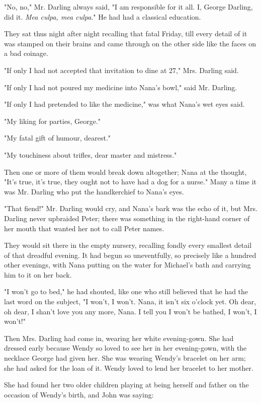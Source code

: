"No, no," Mr. Darling always said,
"I am responsible for it all.
I, George Darling, did it.
\emph{Mea culpa, mea culpa}."
He had had a classical education.


They sat thus night after night recalling that fatal Friday, till every
detail of it was stamped on their brains and came through on the other
side like the faces on a bad coinage.


"If only I had not accepted that invitation to dine at 27," Mrs. Darling
said.


"If only I had not poured my medicine into Nana's bowl," said Mr. Darling.


"If only I had pretended to like the medicine," was what Nana's wet eyes
said.


"My liking for parties, George."


"My fatal gift of humour, dearest."


"My touchiness about trifles, dear master and mistress."


Then one or more of them would break down altogether; Nana at the thought,
"It's true, it's true, they ought not to have had a dog for a nurse." Many
a time it was Mr. Darling who put the handkerchief to Nana's eyes.


"That fiend!" Mr. Darling would cry, and Nana's bark was the echo of it,
but Mrs. Darling never upbraided Peter; there was something in the
right-hand corner of her mouth that wanted her not to call Peter names.


They would sit there in the empty nursery, recalling fondly every smallest
detail of that dreadful evening. It had begun so uneventfully, so
precisely like a hundred other evenings, with Nana putting on the water
for Michael's bath and carrying him to it on her back.


"I won't go to bed," he had shouted, like one who still believed that he
had the last word on the subject, "I won't, I won't. Nana, it isn't six
o'clock yet. Oh dear, oh dear, I shan't love you any more, Nana. I tell
you I won't be bathed, I won't, I won't!"


Then Mrs. Darling had come in, wearing her white evening-gown. She had
dressed early because Wendy so loved to see her in her evening-gown, with
the necklace George had given her. She was wearing Wendy's bracelet on her
arm; she had asked for the loan of it. Wendy loved to lend her bracelet to
her mother.


She had found her two older children playing at being herself and father
on the occasion of Wendy's birth, and John was saying:


